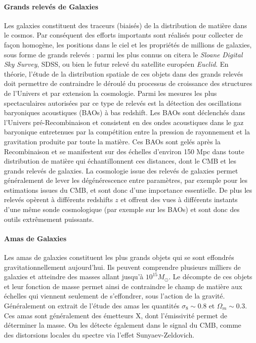 \paragraph{Grands relevés de Galaxies}
Les galaxies  constituent des traceurs (biaisés) de la distribution de matière dans le cosmos. Par conséquent des efforts importants sont réalisés pour collecter de façon homogène, les positions dans le ciel et les propriétés de millions de galaxies, sous forme de grands relevés : parmi les plus connus on citera le \textit{Sloane Digital Sky Survey}, SDSS, ou bien le futur relevé du satellite européen \textit{Euclid}. En théorie, l'étude de la distribution spatiale de ces objets dans des grands relevés doit permettre de contraindre le déroulé du processus de croissance des structures de l'Univers et par extension la cosmologie. Parmi les mesures les plus spectaculaires autorisées par ce type de relevés est la détection des oscillations baryoniques acoustiques (BAOs) à bas redshift. Les BAOs sont déclenchés dans l'Univers pré-Recombinaison et consistent en des ondes acoustiques dans le gaz baryonique entretenues par la compétition entre la pression de rayonnement et la gravitation produite par toute la matière. Ces BAOs sont gelés après la Recombinaison et se manifestent sur des échelles d'environ 150 Mpc dans toute distribution de matière qui échantillonnent ces distances, dont le CMB et les grands relevés de galaxies.  La cosmologie issue des relevés de galaxies permet généralement de lever les dégénérescence entre paramètres, par exemple pour les estimations issues du CMB, et sont donc d'une importance essentielle. De plus les relevés opèrent à différents redshifts $z$ et offrent  des vues à différents instants d'une même sonde cosmologique (par exemple sur les BAOs) et sont donc des outils extrêmement puissants.

\paragraph{Amas de Galaxies}
Les amas de galaxies constituent les plus grands objets qui se sont effondrés gravitationnellement aujourd'hui. Ils peuvent comprendre plusieurs milliers de galaxies et atteindre des masses allant jusqu'à $10^{15} M_\odot$. Le décompte de ces objets et leur fonction de masse permet ainsi de contraindre le champ de matière aux échelles qui viennent seulement de s'effondrer, sous l'action de la gravité. Généralement on extrait de l'étude des amas les quantités $\sigma_8\sim 0.8$ et $\Omega_m\sim0.3$. Ces amas sont généralement des émetteurs X, dont l'émissivité permet de déterminer la masse. On les détecte également dans le signal du CMB, comme des distorsions locales du spectre via l'effet Sunyaev-Zeldovich.

